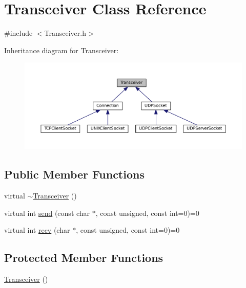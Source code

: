 \hypertarget{classTransceiver}{\section{Transceiver Class Reference}
\label{classTransceiver}
}


{\ttfamily \#include $<$Transceiver.\+h$>$}



Inheritance diagram for Transceiver\+:
\nopagebreak
\begin{figure}[H]
\begin{center}
\leavevmode
\includegraphics[width=350pt]{classTransceiver__inherit__graph}
\end{center}
\end{figure}
\subsection*{Public Member Functions}
\begin{DoxyCompactItemize}
\item 
virtual \hyperlink{classTransceiver_a09118fef519a75434a3f42ab7d506c74}{$\sim$\+Transceiver} ()
\item 
virtual int \hyperlink{classTransceiver_aa54935e0032d9ab6c531024e001ae19d}{send} (const char $\ast$, const unsigned, const int=0)=0
\item 
virtual int \hyperlink{classTransceiver_aef7153a423766522f4f82c1300157048}{recv} (char $\ast$, const unsigned, const int=0)=0
\end{DoxyCompactItemize}
\subsection*{Protected Member Functions}
\begin{DoxyCompactItemize}
\item 
\hyperlink{classTransceiver_a8a846d40a2108ebe79003e231d9968e3}{Transceiver} ()
\end{DoxyCompactItemize}


